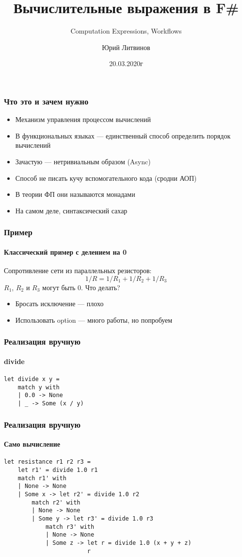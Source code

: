 \documentclass[xetex,mathserif,serif]{beamer}
\title{Вычислительные выражения в F\#}
\subtitle{Computation Expressions, Workflows}
\author{Юрий Литвинов}
\date{20.03.2020г}
\begin{document}
	
	\frame{\titlepage}
	
	\begin{frame}
		\frametitle{Что это и зачем нужно}
		\begin{itemize}
			\item Механизм управления процессом вычислений
			\item В функциональных языках --- единственный способ определить порядок вычислений
			\item Зачастую --- нетривиальным образом (Async)
			\item Способ не писать кучу вспомогательного кода (сродни АОП)
			\item В теории ФП они называются монадами
			\item На самом деле, синтаксический сахар
		\end{itemize}
	\end{frame}

	\begin{frame}
		\frametitle{Пример}
		\framesubtitle{Классический пример с делением на 0}
		Сопротивление сети из параллельных резисторов:
		$$1/R = 1/R_1 + 1/R_2 + 1/R_3$$
		$R_1$, $R_2$ и $R_3$ могут быть 0. Что делать?
		\begin{itemize}
			\item Бросать исключение --- плохо
			\item Использовать option --- много работы, но попробуем
		\end{itemize}
	\end{frame}

	\begin{frame}[fragile]
		\frametitle{Реализация вручную}
		\framesubtitle{divide}
		\begin{verbatim}
let divide x y =
    match y with
    | 0.0 -> None
    | _ -> Some (x / y)
		\end{verbatim}
	\end{frame}

	\begin{frame}[fragile]
		\frametitle{Реализация вручную}
		\framesubtitle{Само вычисление}
		\begin{verbatim}
let resistance r1 r2 r3 =
    let r1' = divide 1.0 r1
    match r1' with
    | None -> None
    | Some x -> let r2' = divide 1.0 r2
        match r2' with
        | None -> None
        | Some y -> let r3' = divide 1.0 r3
            match r3' with
            | None -> None
            | Some z -> let r = divide 1.0 (x + y + z)
                        r
		\end{verbatim}
	\end{frame}
\end{document}
